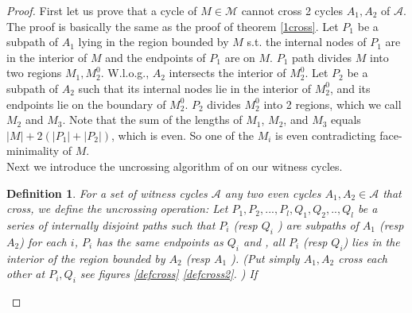 \documentclass[letterpaper,11pt]{article}
\newtheorem{definition}[theorem]{Definition}
\newcommand{\0}{\mathbb{0}}
\newcommand{\1}{\mathbb{1}}
\begin{document}
\begin{proof}
First let us prove that a cycle of $M \in \mathcal{M} $ cannot cross 2 cycles $A_1 , A_2$ of $\mathcal{A}  $. The proof is basically the same as the proof of theorem \ref{1cross}. Let $P_1$ 
be a subpath of $A_1$ 
lying in the region bounded by $M$ s.t. the internal nodes of $P_1$ are in the interior of $M$ and the endpoints of $P_1$ are on $M$. $P_1$ path divides $M$ into two regions $M_1, M^0_2 $. W.l.o.g.,  $A_2$ intersects the interior of $M^0_2$. Let $P_2$ be a subpath of $A_2$ such that its internal nodes lie in the interior of $M^0_2$, and its endpoints lie on the boundary of $M^0_2$.  $P_2$ divides $M^0_2$ into 2 regions, which we call $M_2$ and $M_3$. Note that the sum of the lengths of $M_1$, $M_2$, and $M_3$ equals $|M| +2(|P_1|+|P_2|)$, which is even. So one of the $M_i$ is even contradicting face-minimality of $M$.\\
%
Next we introduce the uncrossing algorithm of \cite{GW98} on our witness cycles. %
\begin{definition}\label{uncrossing} \cite{GW98}
For  a set of witness cycles $ \mathcal{A} $ any two even cycles $A_1, A_2 \in \mathcal{A}$  that cross, we define the uncrossing operation: Let  $P_1, P_2 ,..., P_l ,Q_1, Q_2, .., Q_l$ be a series of internally disjoint paths such that $P_i$ (resp $Q_i$ )  are subpaths of $A_1$ (resp $A_2$)  for each $i$,  $P_i$ has the same endpoints as  $Q_i$  and , all $P_i$ (resp $Q_i$) lies in the interior of the region bounded by $A_2$ (resp $A_1$  ).  (Put simply $A_1 , A_2 $ cross each other at $P_i, Q_i $ see figures \ref{defcross} \ref{defcross2}. ) If 

\end{definition}
\end{proof}
\end{document}
